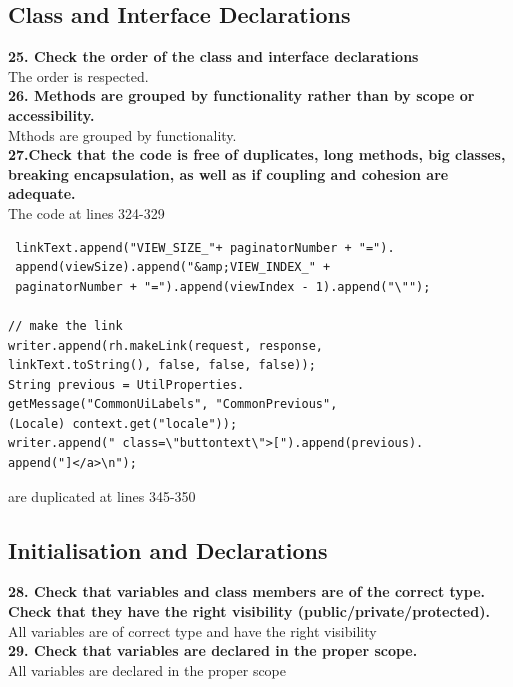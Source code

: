 \documentclass{article}
\begin{document}
\begin{flushleft}
\subsection{Class and Interface Declarations}

\textbf{25. Check the order of the class and interface declarations}\\
\vspace{0.5cm}
The order is respected.\\
\vspace{0.5cm}
\textbf{26. Methods are grouped by functionality rather than by scope or accessibility.}\\
\vspace{0.5cm}
Mthods are grouped by functionality.\\
\vspace{0.5cm}
\textbf{27.Check that the code is free of duplicates, long methods, big classes, breaking encapsulation, as well as if coupling and cohesion are adequate.}\\
\vspace{0.5cm}
The code at lines 324-329 \\
\vspace{0.5cm}
\begin{lstlisting}
 linkText.append("VIEW_SIZE_"+ paginatorNumber + "=").
 append(viewSize).append("&amp;VIEW_INDEX_" + 
 paginatorNumber + "=").append(viewIndex - 1).append("\"");

// make the link
writer.append(rh.makeLink(request, response, 
linkText.toString(), false, false, false));
String previous = UtilProperties.
getMessage("CommonUiLabels", "CommonPrevious", 
(Locale) context.get("locale"));
writer.append(" class=\"buttontext\">[").append(previous).
append("]</a>\n");
\end{lstlisting}
\vspace{0.5cm}
are duplicated at lines 345-350\\
\vspace{0.5cm}




\subsection{ Initialisation and Declarations}
\textbf{28. Check that variables and class members are of the correct type. Check that they have the right visibility (public/private/protected).}\\
\vspace{0.5cm}
All variables are of correct type and have the right visibility\\
\vspace{0.5cm}
\textbf{29. Check that variables are declared in the proper scope.}\\
\vspace{0.5cm}
All variables are declared in the proper scope\\
\vspace{0.5cm}


\end{flushleft}
\end{document}
